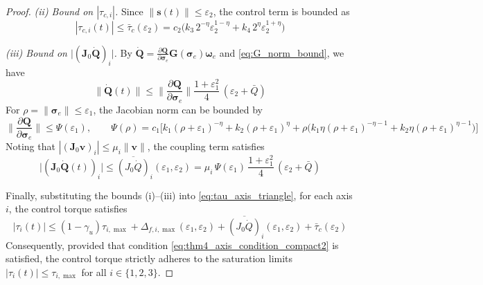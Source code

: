 \documentclass[journal]{new-aiaa}
\begin{document}
\begin{proof}
\emph{(ii) Bound on $|\tau_{c,i}|$.}
Since $\|\boldsymbol{s}(t)\|\le \varepsilon_2$, the control term is bounded as
\begin{equation}
|\tau_{c,i}(t)|
\le \bar\tau_c(\varepsilon_2) =
c_2\Big(k_3\,2^{-\eta}\varepsilon_2^{1-\eta}+k_4\,2^{\eta}\varepsilon_2^{1+\eta}\Big)
\label{eq:thm4_tauc_bar_compact2}
\end{equation}

\emph{(iii) Bound on $\big|(\boldsymbol{J}_0\dot{\boldsymbol{Q}})_i\big|$.}
By $\dot{\boldsymbol{Q}}=\frac{\partial \boldsymbol{Q}}{\partial \boldsymbol{\sigma}_e}\boldsymbol{G}(\boldsymbol{\sigma}_e)\boldsymbol{\omega}_e$ and \eqref{eq:G_norm_bound}, we have
\[
\|\dot{\boldsymbol{Q}}(t)\|
\le \Big\|\frac{\partial \boldsymbol{Q}}{\partial \boldsymbol{\sigma}_e}\Big\|
\frac{1+\varepsilon_1^2}{4}\,(\varepsilon_2+\bar Q)
\]
For $\rho = \|\boldsymbol{\sigma}_e\|\le\varepsilon_1$, the Jacobian norm can be bounded by
\begin{equation}
\Big\|\frac{\partial \boldsymbol{Q}}{\partial \boldsymbol{\sigma}_e}\Big\|
\le \Psi(\varepsilon_1),
\qquad
\Psi(\rho) =
c_1\Big[
k_1(\rho + \varepsilon_1)^{-\eta}
+ k_2(\rho + \varepsilon_1)^{\eta}
+ \rho\big(
k_1\eta(\rho + \varepsilon_1)^{-\eta-1}
+ k_2\eta(\rho + \varepsilon_1)^{\eta-1}
\big)
\Big]
\label{eq:Psi_def_thm4_local}
\end{equation}
Noting that $|(\boldsymbol{J}_0\boldsymbol{v})_i|\le\mu_i\|\boldsymbol{v}\|$, the coupling term satisfies
\begin{equation}
\big|(\boldsymbol{J}_0\dot{\boldsymbol{Q}}(t))_i\big|
\le \overline{(J_0\dot Q)}_i(\varepsilon_1,\varepsilon_2) = 
\mu_i\,\Psi(\varepsilon_1)\,\frac{1+\varepsilon_1^2}{4}\,(\varepsilon_2+\bar Q)
\label{eq:thm4_JQdot_bar_compact2}
\end{equation}

Finally, substituting the bounds (i)--(iii) into \eqref{eq:tau_axis_triangle}, for each axis $i$, the control torque satisfies
\[
|\tau_i(t)|
\le (1-\gamma_u)\tau_{i,\max}
+\Delta_{f,i,\max}(\varepsilon_1,\varepsilon_2)
+\overline{(J_0\dot Q)}_i(\varepsilon_1,\varepsilon_2)
+\bar\tau_c(\varepsilon_2)
\]
Consequently, provided that condition \eqref{eq:thm4_axis_condition_compact2} is satisfied, 
the control torque strictly adheres to the saturation limits $|\tau_i(t)| \le \tau_{i,\max}$ for all $i \in \{1,2,3\}$.
\end{proof}
\end{document}

